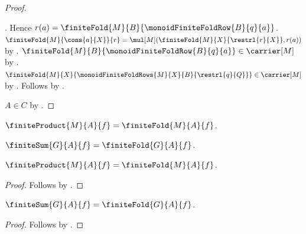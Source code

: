 \begin{proof}
\begin{subproof}
\begin{subproof}
\begin{byCase}
                    .
                Hence $r(a)=\finiteFold{M}{B}{
                    \monoidFiniteFoldRow{B}{q}{a}}$.
                $\finiteFold{M}{\cons{a}{X}}{r}
                    =\mul[M](\finiteFold{M}{X}{\restrl{r}{X}},r(a))$
                    by .
                $\finiteFold{M}{B}{
                        \monoidFiniteFoldRow{B}{q}{a}}
                    \in\carrier[M]$ by
                    .
                $\finiteFold{M}{X}{
                        \monoidFiniteFoldRows{M}{X}{B}{
                            \restrl{q}{Q}}}
                    \in\carrier[M]$ by
                    .
                Follows by \auto.
            \end{byCase}
        \end{subproof}
    \end{subproof}
    $A\in C$ by .
\end{proof}

\begin{definition}\label{finite_product}
    $\finiteProduct{M}{A}{f}=\finiteFold{M}{A}{f}$.
\end{definition}

\begin{definition}\label{finite_sum}
    $\finiteSum{G}{A}{f}=\finiteFold{G}{A}{f}$.
\end{definition}

\begin{proposition}\label{finite_product_is_finite_fold}
    $\finiteProduct{M}{A}{f}=\finiteFold{M}{A}{f}$.
\end{proposition}
\begin{proof}
    Follows by .
\end{proof}

\begin{proposition}\label{finite_sum_is_finite_fold}
    $\finiteSum{G}{A}{f}=\finiteFold{G}{A}{f}$.
\end{proposition}
\begin{proof}
    Follows by .
\end{proof}
